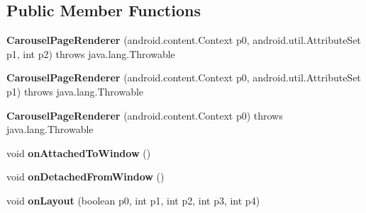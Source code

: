 \subsection*{Public Member Functions}
\begin{DoxyCompactItemize}
\item 
\mbox{\label{classmd5b60ffeb829f638581ab2bb9b1a7f4f3f_1_1CarouselPageRenderer_a345df8dd6878c845c18ebccd4fe946ad}} 
{\bfseries Carousel\+Page\+Renderer} (android.\+content.\+Context p0, android.\+util.\+Attribute\+Set p1, int p2)  throws java.\+lang.\+Throwable 	
\item 
\mbox{\label{classmd5b60ffeb829f638581ab2bb9b1a7f4f3f_1_1CarouselPageRenderer_a1854123685532643ee3bacaf48a7c075}} 
{\bfseries Carousel\+Page\+Renderer} (android.\+content.\+Context p0, android.\+util.\+Attribute\+Set p1)  throws java.\+lang.\+Throwable 	
\item 
\mbox{\label{classmd5b60ffeb829f638581ab2bb9b1a7f4f3f_1_1CarouselPageRenderer_a5d9cc96ac94ffa57b9229e1b243f3137}} 
{\bfseries Carousel\+Page\+Renderer} (android.\+content.\+Context p0)  throws java.\+lang.\+Throwable 	
\item 
\mbox{\label{classmd5b60ffeb829f638581ab2bb9b1a7f4f3f_1_1CarouselPageRenderer_ab5741f0bb83e951d5427e52f40d1abb3}} 
void {\bfseries on\+Attached\+To\+Window} ()
\item 
\mbox{\label{classmd5b60ffeb829f638581ab2bb9b1a7f4f3f_1_1CarouselPageRenderer_afe23a27b24ac448267fc932f75ef5716}} 
void {\bfseries on\+Detached\+From\+Window} ()
\item 
\mbox{\label{classmd5b60ffeb829f638581ab2bb9b1a7f4f3f_1_1CarouselPageRenderer_af11f357363dd9368b7df9be259fd7574}} 
void {\bfseries on\+Layout} (boolean p0, int p1, int p2, int p3, int p4)
\item 
\mbox{\label{classmd5b60ffeb829f638581ab2bb9b1a7f4f3f_1_1CarouselPageRenderer_a5bd9181559c99a4fe32a57d915ec6751}} 

\end{DoxyCompactItemize}
